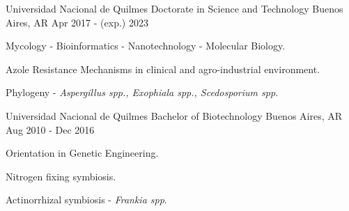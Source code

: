 

\begin{cventries}

  
  \cventry
    {Universidad Nacional de Quilmes} %
    {Doctorate in Science and Technology} %
    {Buenos Aires, AR} %
    {Apr 2017 - (exp.) 2023} %
    {
      \begin{cvitems} %
        \item {Mycology - Bioinformatics - Nanotechnology - Molecular Biology.}
        \item {Azole Resistance Mechanisms in clinical and  agro-industrial environment.} 
        \item {Phylogeny - \textit{Aspergillus spp., Exophiala spp., Scedosporium spp.}}
      \end{cvitems}
    }
    
  \cventry
    {Universidad Nacional de Quilmes} %
    {Bachelor of Biotechnology} %
    {Buenos Aires, AR} %
    {Aug 2010 - Dec 2016} %
    {
      \begin{cvitems} %
        \item {Orientation in Genetic Engineering.}
        \item {Nitrogen fixing symbiosis.}
        \item {Actinorrhizal symbiosis - \textit{Frankia spp}.}
      \end{cvitems}
    }
\end{cventries}
